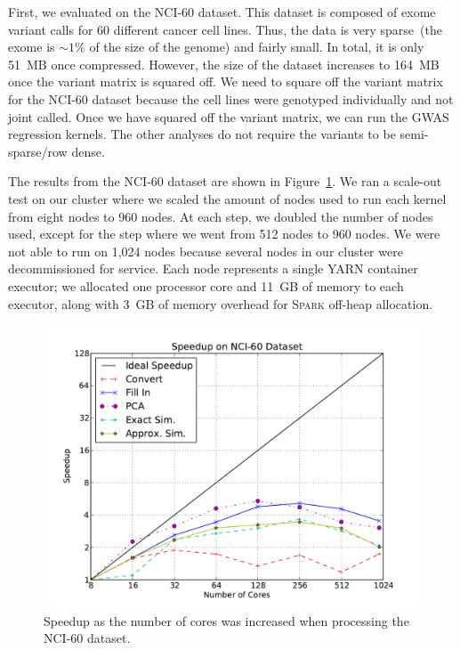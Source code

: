 \documentclass[11pt]{article} %
\begin{document}
First, we evaluated on the NCI-60 dataset. This dataset is composed of exome
variant calls for 60 different cancer cell lines. Thus, the data is very
sparse~(the exome is $\sim1\%$ of the size of the genome) and fairly small.
In total, it is only 51~MB once compressed. However, the size of the dataset
increases to 164~MB once the variant matrix is squared off. We need to square
off the variant matrix for the NCI-60 dataset because the cell lines were
genotyped individually and not joint called. Once we have squared off the
variant matrix, we can run the GWAS regression kernels. The other analyses
do not require the variants to be semi-sparse/row dense.

The results from the NCI-60 dataset are shown in Figure~\ref{fig:nci-60}. We
ran a scale-out test on our cluster where we scaled the amount of nodes used to
run each kernel from eight nodes to 960 nodes. At each step, we doubled the
number of nodes used, except for the step where we went from 512 nodes to 960
nodes. We were not able to run on 1,024 nodes because several nodes in our
cluster were decommissioned for service. Each node represents a single
\textsc{YARN} container executor; we allocated one processor core and 11~GB
of memory to each executor, along with 3~GB of memory overhead for
\textsc{Spark} off-heap allocation.

\begin{figure}[ht]
\begin{center}
\includegraphics[width=0.75\linewidth]{graphs/speedup_nci-60.pdf}
\end{center}
\caption{Speedup as the number of cores was increased when processing the NCI-60
dataset.}
\label{fig:nci-60}
\end{figure}
\end{document}
